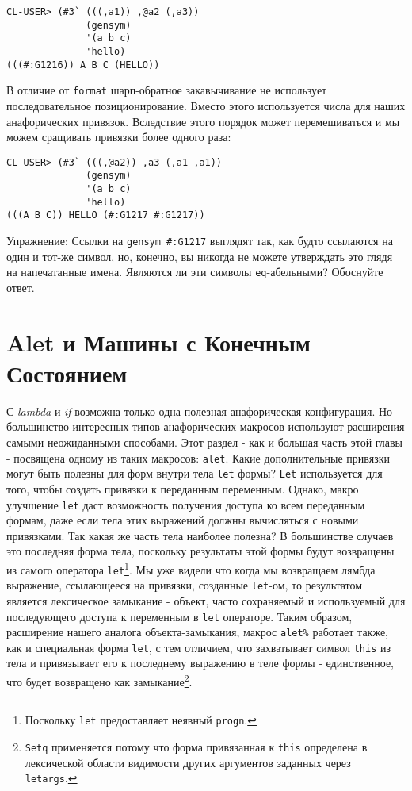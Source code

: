 \begin{verbatim}
CL-USER> (#3` (((,a1)) ,@a2 (,a3))
              (gensym)
              '(a b c)
              'hello)
(((#:G1216)) A B C (HELLO))
\end{verbatim}

В отличие от \verb"format" шарп-обратное закавычивание не использует последовательное позиционирование. Вместо этого используется числа для наших анафорических привязок. Вследствие этого порядок может перемешиваться и мы можем сращивать привязки более одного раза:

\begin{verbatim}
CL-USER> (#3` (((,@a2)) ,a3 (,a1 ,a1))
              (gensym)
              '(a b c)
              'hello)
(((A B C)) HELLO (#:G1217 #:G1217))
\end{verbatim}

Упражнение: Ссылки на \verb"gensym #:G1217" выглядят так, как будто ссылаются на один и тот-же символ, но, конечно, вы никогда не можете утверждать это глядя на напечатанные имена. Являются ли эти символы \verb"eq"-абельными? Обоснуйте ответ.

\section{Alet и Машины с Конечным Состоянием}\label{section_alet_and_finite_state_machines}


С \emph{lambda} и \emph{if} возможна только одна полезная анафорическая конфигурация. Но большинство интересных типов анафорических макросов используют расширения самыми неожиданными способами. Этот раздел - как и большая часть этой главы - посвящена одному из таких макросов: \verb"alet". Какие дополнительные привязки могут быть полезны для форм внутри тела \verb"let" формы? \verb"Let" используется для того, чтобы создать привязки к переданным переменным. Однако, макро улучшение \verb"let" даст возможность получения доступа ко всем переданным формам, даже если тела этих выражений должны вычисляться с новыми привязками. Так какая же часть тела наиболее полезна? В большинстве случаев это последняя форма тела, поскольку результаты этой формы будут возвращены из самого оператора \verb"let"\footnote{Поскольку \verb"let" предоставляет неявный \verb"progn".}. Мы уже видели что когда мы возвращаем лямбда выражение, ссылающееся на привязки, созданные \verb"let"-ом, то результатом является лексическое замыкание - объект, часто сохраняемый и используемый для последующего доступа к переменным в \verb"let" операторе. Таким образом, расширение нашего аналога объекта-замыкания, макрос \verb"alet%" работает также, как и специальная форма \verb"let", с тем отличием, что захватывает символ \verb"this" из тела и привязывает его к последнему выражению в теле формы - единственное, что будет возвращено как замыкание\footnote{\verb"Setq" применяется потому что форма привязанная к \verb"this" определена в лексической области видимости других аргументов заданных через \verb"letargs".}.


